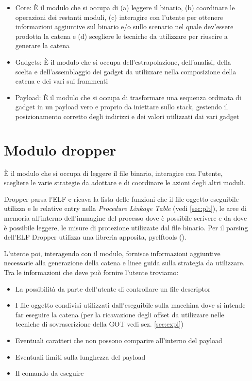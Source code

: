 \begin{itemize}

  \item Core: È il modulo che si occupa di (a) leggere il binario,
    (b) coordinare le operazioni dei restanti moduli, (c) interagire
    con l'utente per ottenere informazioni aggiuntive sul binario e/o
    sullo scenario nel quale dev'essere prodotta la catena e (d)
    scegliere le tecniche da utilizzare per riuscire a generare la
    catena

  \item Gadgets: È il modulo che si occupa dell'estrapolazione,
    dell'analisi, della scelta e dell'assemblaggio dei gadget da utilizzare nella
    composizione della catena e dei vari sui frammenti

  \item Payload: È il modulo che si occupa di trasformare una
    sequenza ordinata di gadget in un payload vero e proprio da
    iniettare sullo stack, gestendo il posizionamento corretto degli
    indirizzi e dei valori utilizzati dai vari gadget

\end{itemize}

\section{Modulo dropper}

È il modulo che si occupa di leggere il file binario, interagire con
l'utente, scegliere le varie strategie da adottare e di coordinare le
azioni degli altri moduli. 

Dropper parsa l'ELF e ricava la lista delle funzioni che il file
oggetto eseguibile utilizza e le relative entry nella \emph{Procedure
  Linkage Table} (vedi \ref{sec:plt}), le aree di memoria all'interno
dell'immagine del processo dove è possibile scrivere e da dove è
possibile leggere, le misure di protezione utilizzate dal file
binario. Per il parsing dell'ELF Dropper utilizza una libreria
apposita, pyelftools (\cite{pyelftools}).

L'utente poi, interagendo con il modulo, fornisce informazioni
aggiuntive necessarie alla generazione della catena e linee guida
sulla strategia da utilizzare. Tra le informazioni che deve può
fornire l'utente troviamo:

\begin{itemize}
  \item La possibilità da parte dell'utente di controllare un file
    descriptor
  \item I file oggetto condivisi utilizzati dall'eseguibile sulla
    macchina dove si intende far eseguire la catena (per la
    ricavazione degli offset da utilizzare nelle tecniche di
    sovrascrizione della GOT vedi sez. \ref{sec:expl})
  \item Eventuali caratteri che non possono comparire all'interno del
    payload
  \item Eventuali limiti sulla lunghezza del payload
  \item Il comando da eseguire
\end{itemize}

